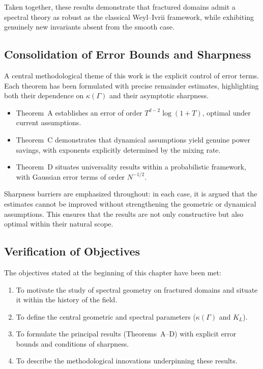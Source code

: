 Taken together, these results demonstrate that fractured domains admit a
spectral theory as robust as the classical Weyl–Ivrii framework, while
exhibiting genuinely new invariants absent from the smooth case.

\subsection{Consolidation of Error Bounds and Sharpness}
A central methodological theme of this work is the explicit control of error
terms. Each theorem has been formulated with precise remainder estimates,
highlighting both their dependence on $\kappa(\Gamma)$ and their asymptotic
sharpness.

\begin{itemize}
    \item Theorem~A establishes an error of order
    $T^{d-2}\log(1+T)$, optimal under current assumptions.
    \item Theorem~C demonstrates that dynamical assumptions yield genuine
    power savings, with exponents explicitly determined by the mixing rate.
    \item Theorem~D situates universality results within a probabilistic
    framework, with Gaussian error terms of order $N^{-1/2}$.
\end{itemize}

Sharpness barriers are emphasized throughout: in each case, it is argued that
the estimates cannot be improved without strengthening the geometric or
dynamical assumptions. This ensures that the results are not only constructive
but also optimal within their natural scope.

\subsection{Verification of Objectives}
The objectives stated at the beginning of this chapter have been met:

\begin{enumerate}
    \item To motivate the study of spectral geometry on fractured domains and
    situate it within the history of the field.
    \item To define the central geometric and spectral parameters
    ($\kappa(\Gamma)$ and $K_L$).
    \item To formulate the principal results (Theorems~A–D) with explicit error
    bounds and conditions of sharpness.
    \item To describe the methodological innovations underpinning these results.
\end{enumerate}

